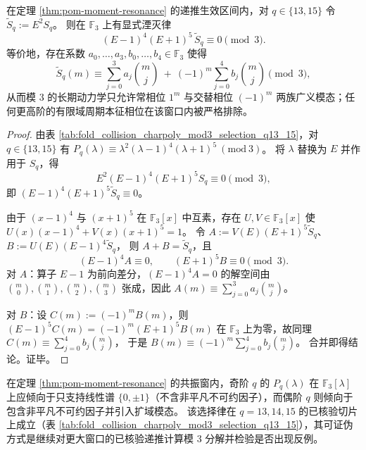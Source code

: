 \begin{proposition}[模 \texorpdfstring{$3$}{3} 的两相压缩：\texorpdfstring{$q=13,15$}{q=13,15} 只剩 \texorpdfstring{$1$}{1} 与 \texorpdfstring{$-1$}{-1} 两类广义相位]\label{prop:pom-moment-mod3-two-phase}
在定理 \ref{thm:pom-moment-resonance} 的递推生效区间内，对 \(q\in\{13,15\}\) 令
\(
\widetilde S_q:=E^2S_q
\)。
则在 \(\mathbb{F}_3\) 上有显式湮灭律
\[
(E-1)^4(E+1)^5\,\widetilde S_q\equiv 0\pmod 3.
\]
等价地，存在系数 \(a_0,\dots,a_3,b_0,\dots,b_4\in\mathbb{F}_3\) 使得
\[
\widetilde S_q(m)\equiv
\sum_{j=0}^{3}a_j\binom{m}{j}
\ +\ 
(-1)^m\sum_{j=0}^{4}b_j\binom{m}{j}
\pmod 3,
\]
从而模 \(3\) 的长期动力学只允许常相位 \(1^m\) 与交替相位 \((-1)^m\) 两族广义模态；任何更高阶的有限域周期本征相位在该窗口内被严格排除。
\end{proposition}
\begin{proof}
由表 \ref{tab:fold_collision_charpoly_mod3_selection_q13_15}，对 \(q\in\{13,15\}\) 有
\(
P_q(\lambda)\equiv \lambda^2(\lambda-1)^4(\lambda+1)^5\ (\mathrm{mod}\ 3)
\)。
将 \(\lambda\) 替换为 \(E\) 并作用于 \(S_q\)，得
\[
E^2(E-1)^4(E+1)^5S_q\equiv 0\pmod 3,
\]
即 \((E-1)^4(E+1)^5\widetilde S_q\equiv 0\)。
\par
由于 \((x-1)^4\) 与 \((x+1)^5\) 在 \(\mathbb{F}_3[x]\) 中互素，存在 \(U,V\in\mathbb{F}_3[x]\) 使
\(
U(x)(x-1)^4+V(x)(x+1)^5=1
\)。
令
\(
A:=V(E)(E+1)^5\widetilde S_q
\)、
\(
B:=U(E)(E-1)^4\widetilde S_q
\)，
则 \(A+B=\widetilde S_q\)，且
\[
(E-1)^4A\equiv 0,\qquad (E+1)^5B\equiv 0\pmod 3.
\]
对 \(A\)：算子 \(E-1\) 为前向差分，\((E-1)^4A=0\) 的解空间由
\(
\binom{m}{0},\binom{m}{1},\binom{m}{2},\binom{m}{3}
\)
张成，因此 \(A(m)\equiv \sum_{j=0}^3 a_j\binom{m}{j}\)。
\par
对 \(B\)：设 \(C(m):=(-1)^mB(m)\)，则
\(
(E-1)^5C(m)=(-1)^m(E+1)^5B(m)
\)
在 \(\mathbb{F}_3\) 上为零，故同理
\(
C(m)\equiv \sum_{j=0}^4 b_j\binom{m}{j}
\)，
于是 \(B(m)\equiv (-1)^m\sum_{j=0}^4 b_j\binom{m}{j}\)。
合并即得结论。证毕。
\end{proof}

\begin{conjecture}\label{conj:pom-charpoly-mod3-odd-even}
在定理 \ref{thm:pom-moment-resonance} 的共振窗内，奇阶 \(q\) 的 \(P_q(\lambda)\) 在 \(\mathbb{F}_3[\lambda]\) 上应倾向于只支持线性谱 \(\{0,\pm 1\}\)（不含非平凡不可约因子），而偶阶 \(q\) 则倾向于包含非平凡不可约因子并引入扩域模态。
该选择律在 \(q=13,14,15\) 的已核验切片上成立（表 \ref{tab:fold_collision_charpoly_mod3_selection_q13_15}），其可证伪方式是继续对更大窗口的已核验递推计算模 \(3\) 分解并检验是否出现反例。
\end{conjecture}

